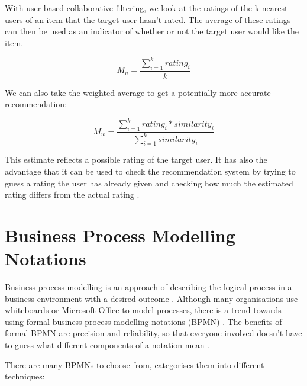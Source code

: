 With user-based collaborative filtering, we look at the ratings of the k nearest users of an item that the target user hasn't rated. The average of these ratings can then be used as an indicator of whether or not the target user would like the item.

\begin{equation}
M_{u} = \frac{\sum_{i=1}^{k}{rating_i}}{k}
\label{mean}
\end{equation}

We can also take the weighted average to get a potentially more accurate recommendation:

\begin{equation}
M_{w} = \frac{\sum_{i=1}^{k}{rating_i * similarity_i}}{\sum_{i=1}^{k}{similarity_i}}
\label{weightedMean}
\end{equation}


This estimate reflects a possible rating of the target user. It has also the advantage that it can be used to check the recommendation system by trying to guess a rating the user has already given and checking how much the estimated rating differs from the actual rating \cite{miningOfMassiveDatasets}. 

\section{Business Process Modelling Notations}

Business process modelling is an approach of describing the logical process in a business environment with a desired outcome \cite{bpm_review_framework}. Although many organisations use whiteboards or Microsoft Office to model processes, there is a trend towards using formal business process modelling notations (BPMN) \cite{ebpma-tec-standards, bpm_review_framework}. The benefits of formal BPMN are precision and reliability, so that everyone involved doesn't have to guess what different components of a notation mean \cite{ebpma-tec-standards}.

There are many BPMNs to choose from, \cite{bpm_review_framework} categorises them into different techniques:

